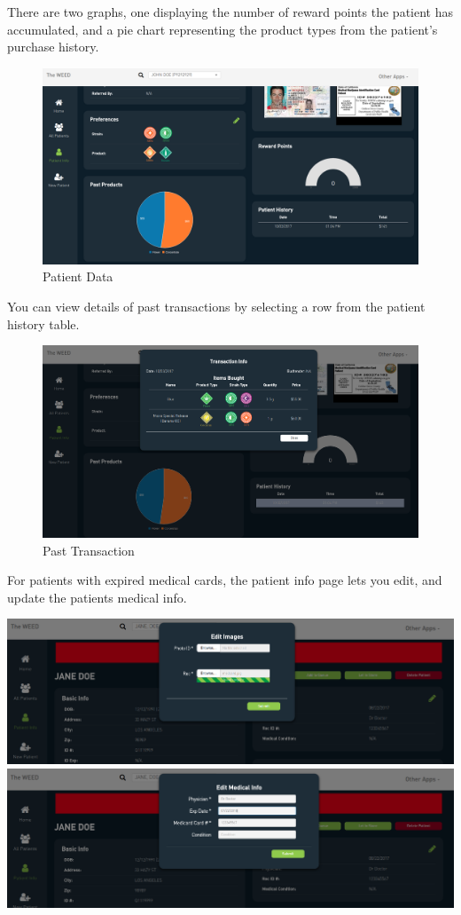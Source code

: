 \documentclass[]{book}
\theoremstyle{definition}
\theoremstyle{definition}
\theoremstyle{definition}
\theoremstyle{remark}
\begin{document}
There are two graphs, one displaying the number of reward points the
patient has accumulated, and a pie chart representing the product types
from the patient's purchase history.

\begin{figure}
\centering
\includegraphics{images/patientInfo2.png}
\caption{Patient Data}
\end{figure}

You can view details of past transactions by selecting a row from the
patient history table.

\begin{figure}
\centering
\includegraphics{images/pastTransaction.png}
\caption{Past Transaction}
\end{figure}

For patients with expired medical cards, the patient info page lets you
edit, and update the patients medical info.

\includegraphics{images/edit1.png} \includegraphics{images/edit2.png}
\end{document}
